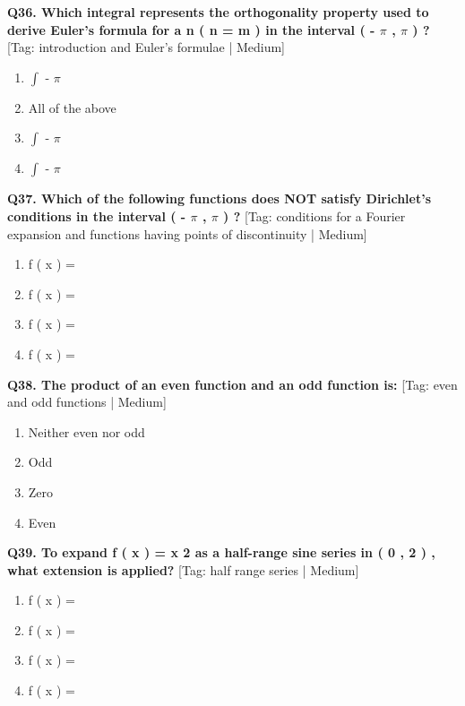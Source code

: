\noindent\textbf{Q36. Which integral represents the orthogonality property used to derive Euler's formula for a n ( n  = m ) in the interval ( - $\pi$ , $\pi$ ) ?} \hfill [Tag: introduction and Euler's formulae | Medium]
\begin{enumerate}[label=(\alph*),topsep=2pt,itemsep=1pt,partopsep=0pt,parsep=0pt]
    \item {{$\int$ - $\pi$}}
    \item {{All of the above}}
    \item {{$\int$ - $\pi$}}
    \item {{$\int$ - $\pi$}}
\end{enumerate}
\vspace{2mm}

\noindent\textbf{Q37. Which of the following functions does NOT satisfy Dirichlet's conditions in the interval ( - $\pi$ , $\pi$ ) ?} \hfill [Tag: conditions for a Fourier expansion and functions having points of discontinuity | Medium]
\begin{enumerate}[label=(\alph*),topsep=2pt,itemsep=1pt,partopsep=0pt,parsep=0pt]
    \item {{f ( x ) =}}
    \item {{f ( x ) =}}
    \item {{f ( x ) =}}
    \item {{f ( x ) =}}
\end{enumerate}
\vspace{2mm}

\noindent\textbf{Q38. The product of an even function and an odd function is:} \hfill [Tag: even and odd functions | Medium]
\begin{enumerate}[label=(\alph*),topsep=2pt,itemsep=1pt,partopsep=0pt,parsep=0pt]
    \item {{Neither even nor odd}}
    \item {{Odd}}
    \item {{Zero}}
    \item {{Even}}
\end{enumerate}
\vspace{2mm}

\noindent\textbf{Q39. To expand f ( x ) = x 2 as a half-range sine series in ( 0 , 2 ) , what extension is applied?} \hfill [Tag: half range series | Medium]
\begin{enumerate}[label=(\alph*),topsep=2pt,itemsep=1pt,partopsep=0pt,parsep=0pt]
    \item {{f ( x ) =}}
    \item {{f ( x ) =}}
    \item {{f ( x ) =}}
    \item {{f ( x ) =}}
\end{enumerate}
\vspace{2mm}

